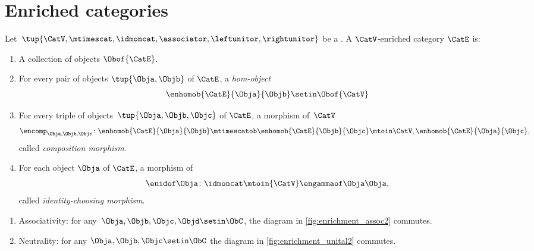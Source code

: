 
\section{Enriched categories}
\label{sec:enrichment-enriched-categories}

\begin{ctdefinition}
    \label{def:enriched_cat}
    Let~$\tup{\CatV, \mtimescat, \idmoncat, \associator, \leftunitor, \rightunitor}$ be a .
    A $\CatV$-enriched category $\CatE$ is:
    
    \constit
    \begin{enumerate}
    \item A collection of objects $\Obof{\CatE}$.
    \item For every pair of objects $\tup{\Obja, \Objb}$ of $\CatE$, a \emph{hom-object}
             \begin{equation}
                  \enhomob{\CatE}{\Obja}{\Objb} \setin \Obof{\CatV}
              \end{equation}
        \item For every triple of objects~$\tup{\Obja, \Objb, \Objc}$ of $\CatE$, a morphism of~$\CatV$
              \begin{equation}
                  \encomp_{\Obja,\Objb,\Objc}\colon \enhomob{\CatE}{\Obja}{\Objb} \mtimescatob \enhomob{\CatE}{\Objb}{\Objc} \mtoin\CatV, \enhomob{\CatE}{\Obja}{\Objc},
              \end{equation}
            called \emph{composition morphism}.
        \item For each object $\Obja$ of $\CatE$, a morphism of~\CatV
              \begin{equation}
                  \enidof\Obja \colon \idmoncat \mtoin{\CatV} \engammaof\Obja\Obja,
              \end{equation}
              called \emph{identity-choosing morphism}.
               \end{enumerate}
               
               \condit
             \begin{enumerate}
\item Associativity: for any~$\Obja,\Objb,\Objc,\Objd\setin \ObC$, the diagram in \cref{fig:enrichment_assoc2} commutes.
\item Neutrality: for any $\Obja,\Objb,\Objc \setin \ObC$ the diagram in \cref{fig:enrichment_unital2} commutes.
\end{enumerate}
\end{ctdefinition}


